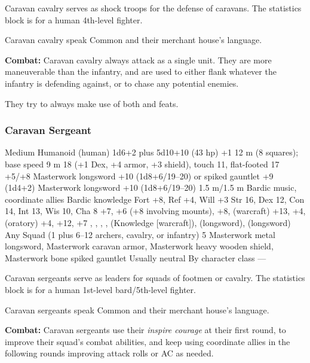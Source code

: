 Caravan cavalry serves as shock troops for the defense of caravans. The statistics block is for a human 4th-level fighter.

Caravan cavalry speak Common and their merchant house's language.

\textbf{Combat:} Caravan cavalry always attack as a single unit. They are more maneuverable than the infantry, and are used to either flank whatever the infantry is defending against, or to chase any potential enemies.

They try to always make use of both  and  feats.

\subsubsection{Caravan Sergeant}
\begin{MonsterStats}
{Medium Humanoid (human)}
{1d6+2 plus 5d10+10 (43 hp)}
{+1}
{12 m (8 squares); base speed 9 m}
{18 (+1 Dex, +4 armor, +3 shield), touch 11, flat-footed 17}
{+5/+8}
{Masterwork longsword +10 (1d8+6/19--20) or spiked gauntlet +9 (1d4+2)}
{Masterwork longsword +10 (1d8+6/19--20)}
{1.5 m/1.5 m}
{Bardic music, coordinate allies}
{Bardic knowledge}
{Fort +8, Ref +4, Will +3}
{Str 16, Dex 12, Con 14, Int 13, Wis 10, Cha 8}
{
	 +7,
	 +6 (+8 involving mounts),
	 +8,
	 (warcraft) +13,
	 +4,
	 (oratory) +4,
	 +12,
	 +7
}
{
	,
	,
	,
	,
	 (Knowledge [warcraft]),
	 (longsword),
	 (longsword)
}
{Any}
{Squad (1 plus 6--12 archers, cavalry, or infantry)}
{5}
{
	Masterwork metal longsword,
	Masterwork caravan armor,
	Masterwork heavy wooden shield,
	Masterwork bone spiked gauntlet
}
{Usually neutral}
{By character class}
{---}
\end{MonsterStats}

Caravan sergeants serve as leaders for squads of footmen or cavalry. The statistics block is for a human 1st-level bard/5th-level fighter.

Caravan sergeants speak Common and their merchant house's language.

\textbf{Combat:} Caravan sergeants use their \emph{inspire courage} at their first round, to improve their squad's combat abilities, and keep using coordinate allies in the following rounds improving attack rolls or AC as needed.


